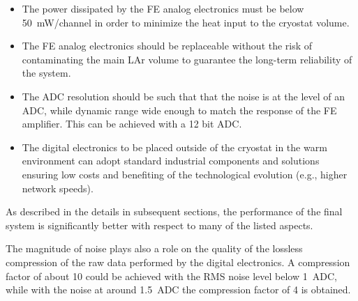 \begin{itemize}
\item{The power dissipated by the FE analog electronics must be below \SI{50}{\milli\watt/channel} in order to minimize the heat input to the cryostat volume.}
\item{The FE analog electronics should be replaceable without the risk of contaminating the main LAr volume to guarantee the long-term reliability of the system.}
\item{The ADC resolution should be such that that the noise is at the level of an ADC, while dynamic range wide enough to match the response of the FE amplifier. This can be achieved with a 12 bit ADC.}
\item{The digital electronics to be placed outside of the cryostat in the warm environment can adopt standard industrial components and solutions ensuring low costs and benefiting of the technological evolution (e.g., higher network speeds).}
\end{itemize}
As described in the details in subsequent sections, the performance of the final system is significantly better with respect to many of the listed aspects.  

The magnitude of noise plays also a role on the quality of the lossless compression of the raw data performed by the digital electronics. A compression factor of about \num{10} could be achieved with the RMS noise level below \SI{1}{ADC}, while with the noise at around \SI{1.5}{ADC} the compression factor of \num{4} is obtained. 


